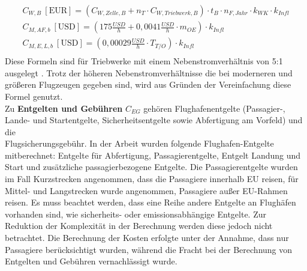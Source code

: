 \begin{equation}
   \begin{split}
   {C_{W,B} ~[\text{EUR}]} = (C_{W,Zelle,B} + n_{T} \cdot C_{W,Triebwerk,B} ) \cdot t_{B} \cdot n_{F, Jahr} \cdot k_{WK} \cdot k_{Infl}\\
%
   {C_{M,AF,b} ~[\text{USD}]} = (175 \frac{USD}{h} + 0,0041 \frac{USD}{h} \cdot m_{OE} )\cdot k_{Infl}\\
%
   {C_{M,E,L,b} ~[\text{USD}]} = (0,00029 \frac{USD}{h} \cdot T_{T/O} )\cdot k_{Infl}\\
   \label{maintenance}
   \end{split}
\end{equation}
%
Diese Formeln sind für Triebwerke mit einem Nebenstromverhältnis von 5:1 ausgelegt \cite{bruge2018wartungskosten}. %
Trotz der höheren Nebenstromverhältnisse die bei moderneren und größeren Flugzeugen gegeben sind,
wird aus Gründen der Vereinfachung diese Formel genutzt.\\
%
%

Zu \textbf{Entgelten und Gebühren} $C_{EG}$ gehören Flughafenentgelte 
(Passagier-, Lande- und Startentgelte, Sicherheitsentgelte sowie Abfertigung am Vorfeld)
und die \\Flugsicherungsgebühr. 
%
In der Arbeit wurden folgende Flughafen-Entgelte mitberechnet: Entgelte für Abfertigung, 
Passagierentgelte, Entgelt Landung und Start
und zusätzliche passagierbezogene Entgelte. Die Passagierentgelte wurden im Fall Kurzstrecken angenommen,
dass die Passagiere innerhalb EU reisen, für Mittel- und Langstrecken wurde angenommen, 
Passagiere außer EU-Rahmen reisen.
Es muss beachtet werden, dass eine Reihe andere Entgelte an Flughäfen vorhanden sind, 
wie sicherheits- oder emissionsabhängige Entgelte. Zur Reduktion der Komplexität in der Berechnung 
werden diese jedoch nicht betrachtet.
Die Berechnung der Kosten erfolgte unter der Annahme, dass nur Passagiere berücksichtigt wurden, 
während die Fracht bei der Berechnung von Entgelten und Gebühren vernachlässigt wurde.

